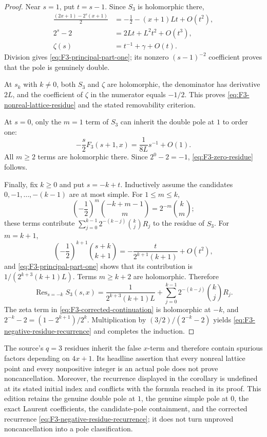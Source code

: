 \begin{proof}
Near $s=1$, put $t=s-1$.  Since $S_3$ is holomorphic there,
\begin{align*}
 \frac{(2x+1)-2^s(x+1)}2
   &=-\frac12-(x+1)Lt+O(t^2),\\
 2^s-2&=2Lt+L^2t^2+O(t^3),\\
 \zeta(s)&=t^{-1}+\gamma+O(t).
\end{align*}
Division gives \cref{eq:F3-principal-part-one}; its nonzero
$(s-1)^{-2}$ coefficient proves that the pole is genuinely double.

At $s_k$ with $k\ne0$, both $S_3$ and $\zeta$ are holomorphic,
the denominator has derivative $2L$, and the coefficient of $\zeta$ in
the numerator equals $-1/2$.  This proves
\cref{eq:F3-nonreal-lattice-residue} and the stated removability
criterion.

At $s=0$, only the $m=1$ term of $S_3$ can inherit the double pole at
$1$ to order one:
\[
 -\frac{s}{2}F_3(s+1,x)=\frac1{8L}s^{-1}+O(1).
\]
All $m\geq2$ terms are holomorphic there.  Since $2^0-2=-1$,
\cref{eq:F3-zero-residue} follows.

Finally, fix $k\geq0$ and put $s=-k+t$.  Inductively assume the
candidates $0,-1,\ldots,-(k-1)$ are at most simple.  For
$1\leq m\leq k$,
\[
 \left(-\frac12\right)^m\binom{-k+m-1}{m}
 =2^{-m}\binom{k}{m};
\]
these terms contribute
$\sum_{j=0}^{k-1}2^{-(k-j)}\binom{k}{j}R_j$ to the residue of $S_3$.
For $m=k+1$,
\[
 \left(-\frac12\right)^{k+1}\binom{s+k}{k+1}
 =-\frac{t}{2^{k+1}(k+1)}+O(t^2),
\]
and \cref{eq:F3-principal-part-one} shows that its contribution is
$1/(2^{k+3}(k+1)L)$.  Terms $m\geq k+2$ are holomorphic.  Therefore
\[
 \operatorname{Res}_{s=-k}S_3(s,x)
 =\frac1{2^{k+3}(k+1)L}
  +\sum_{j=0}^{k-1}2^{-(k-j)}\binom{k}{j}R_j.
\]
The zeta term in \cref{eq:F3-corrected-continuation} is holomorphic at
$-k$, and
$2^{-k}-2=(1-2^{k+1})/2^k$.  Multiplication by
$(3/2)/(2^{-k}-2)$ yields
\cref{eq:F3-negative-residue-recurrence} and completes the induction.
\end{proof}

\begin{sourceissue}[the printed $q=3$ pole claims and recurrence]
The source's $q=3$ residues inherit the false $x$-term and therefore
contain spurious factors depending on $4x+1$.  Its headline assertion that
every nonreal lattice point and every nonpositive integer is an actual pole
does not prove noncancellation.  Moreover, the recurrence displayed in the
corollary is undefined at its stated initial index and conflicts with the
formula reached in its proof.  This edition retains the genuine double pole
at $1$, the genuine simple pole at $0$, the exact Laurent coefficients, the
candidate-pole containment, and the corrected recurrence
\cref{eq:F3-negative-residue-recurrence}; it does not turn unproved
noncancellation into a pole classification.
\end{sourceissue}
